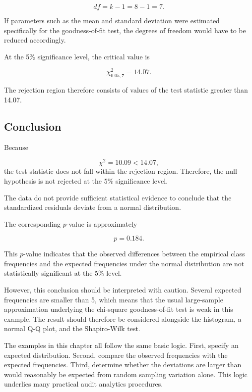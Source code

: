\begin{equation*}
df = k-1 = 8-1 = 7.
\end{equation*}

If parameters such as the mean and standard deviation were estimated specifically for the goodness-of-fit test, the degrees of freedom would have to be reduced accordingly.

At the 5\% significance level, the critical value is

\begin{equation*}
\chi^2_{0.05,7} = 14.07.
\end{equation*}

The rejection region therefore consists of values of the test statistic greater than 14.07.

\subsection*{Conclusion}

Because

\begin{equation*}
\chi^2 = 10.09 < 14.07,
\end{equation*}
the test statistic does not fall within the rejection region. Therefore, the null hypothesis is not rejected at the 5\% significance level.

The data do not provide sufficient statistical evidence to conclude that the standardized residuals deviate from a normal distribution.

\medskip
The corresponding \(p\)-value is approximately

\begin{equation*}
p = 0.184.
\end{equation*}

This \(p\)-value indicates that the observed differences between the empirical class frequencies and the expected frequencies under the normal distribution are not statistically significant at the 5\% level.

However, this conclusion should be interpreted with caution. Several expected fre\-quencies are smaller than 5, which means that the usual large-sample approximation underlying the chi-square goodness-of-fit test is weak in this example. The result should therefore be considered alongside the histogram, a normal Q-Q plot, and the Shapiro-Wilk test.

\medskip
The examples in this chapter all follow the same basic logic. First, specify an expected distribution. Second, compare the observed fre\-quencies with the expected frequencies. Third, determine whether the deviations are larger than would reasonably be expected from random sampling variation alone. This logic underlies many practical audit ana\-lytics procedures.


